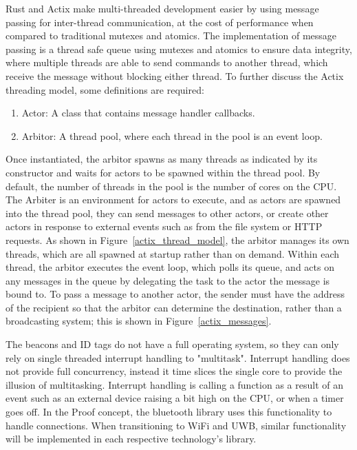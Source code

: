 \bigskip
Rust and Actix make multi-threaded development easier by using message passing for inter-thread communication, at the cost of performance when compared to traditional mutexes and atomics.
The implementation of message passing is a thread safe queue using mutexes and atomics to ensure data integrity, where multiple threads are able to send commands to another thread, which receive the message without blocking either thread.
To further discuss the Actix threading model, some definitions are required:
\begin{enumerate}
	\item Actor: A class that contains message handler callbacks.
	\item Arbitor: A thread pool, where each thread in the pool is an event loop.
\end{enumerate}
Once instantiated, the arbitor spawns as many threads as indicated by its constructor and waits for actors to be spawned within the thread pool.
By default, the number of threads in the pool is the number of cores on the CPU.
The \Gls{Arbiter} is an environment for actors to execute, and as actors are spawned into the thread pool, they can send messages to other actors, or create other actors in response to external events such as from the file system or HTTP requests.
As shown in Figure~\ref{actix_thread_model}, the arbitor manages its own threads, which are all spawned at startup rather than on demand.
Within each thread, the arbitor executes the event loop, which polls its queue, and acts on any messages in the queue by delegating the task to the actor the message is bound to.
To pass a message to another actor, the sender must have the address of the recipient so that the arbitor can determine the destination, rather than a broadcasting system; this is shown in Figure~\ref{actix_messages}.

\bigskip
The beacons and ID tags do not have a full operating system, so they can only rely on single threaded interrupt handling to "multitask".
Interrupt handling does not provide full concurrency, instead it time slices the single core to provide the illusion of multitasking.
Interrupt handling is calling a function as a result of an event such as an external device raising a bit high on the CPU, or when a timer goes off.
In the Proof concept, the bluetooth library uses this functionality to handle connections. When transitioning to WiFi and UWB, similar functionality will be implemented in each respective technology's library.


